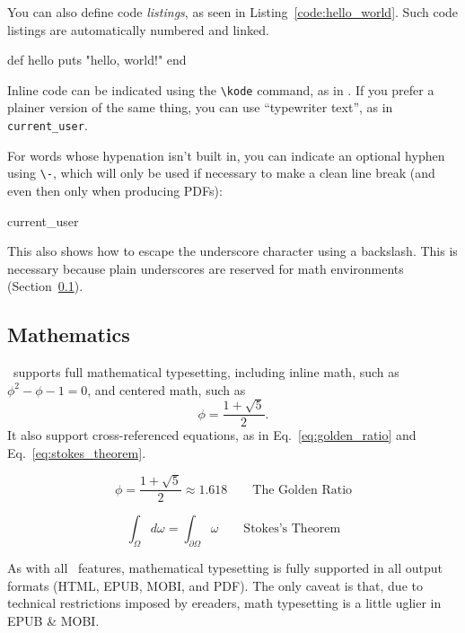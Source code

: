 You can also define code \emph{listings}, as seen in Listing~\ref{code:hello_world}. Such code listings are automatically numbered and linked.

\begin{codelisting}
\label{code:hello_world}
\begin{code}
def hello
  puts "hello, world!"
end
\end{code}
\end{codelisting}

Inline code can be indicated using the \verb+\kode+ command, as in . If you prefer a plainer version of the same thing, you can use ``typewriter text'', as in \texttt{current\_\-user}.

For words whose hypenation isn't built in, you can indicate an optional hyphen using \verb+\-+, which will only be used if necessary to make a clean line break (and even then only when producing PDFs):
\begin{code}
current\_\-user
\end{code}
This also shows how to escape the underscore character using a backslash. This is necessary because plain underscores are reserved for math environments (Section~\ref{sec:mathematics}).

\subsection{Mathematics}
\label{sec:mathematics}

\PolyTeXnic\ supports full mathematical typesetting, including inline math, such as $\phi^2 - \phi - 1 = 0$, and centered math, such as
\[ \phi = \frac{1+\sqrt{5}}{2}. \]
It also support cross-referenced equations, as in Eq.~\eqref{eq:golden_ratio} and Eq.~\eqref{eq:stokes_theorem}.

\begin{equation}
\label{eq:golden_ratio}
\phi = \frac{1+\sqrt{5}}{2} \approx 1.618 \qquad{\text{The Golden Ratio}}
\end{equation}

\begin{equation}
\label{eq:stokes_theorem}
\int_\Omega d\omega = \int_{\partial\Omega} \omega \qquad{\text{Stokes's Theorem}}
\end{equation}

As with all \PolyTeXnic\ features, mathematical typesetting is fully supported in all output formats (HTML, EPUB, MOBI, and PDF). The only caveat is that, due to technical restrictions imposed by ereaders, math typesetting is a little uglier in EPUB \& MOBI.

